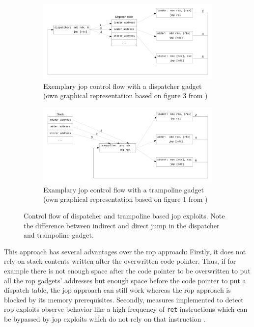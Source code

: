 \begin{figure}[htb]
	\centering
	\begin{subfigure}[t]{0.8\textwidth}
		\centering
		\includegraphics[width=\textwidth]{figures/jop-dispatcher}
		\caption{Exemplary \acs{jop} control flow with a dispatcher gadget (own graphical representation based on figure 3 from \cite{Bletsch2011})}
		\label{fig:jop-dispatcher}
		\vspace*{1em}
	\end{subfigure}
	\begin{subfigure}[t]{0.8\textwidth}
		\centering
		\includegraphics[width=\textwidth]{figures/jop-trampoline}
		\caption{Examplary \acs{jop} control flow with a trampoline gadget (own graphical representation based on figure 1 from \cite{Checkoway2010})}
		\label{fig:jop-trampoline}
	\end{subfigure}
	\caption{Control flow of dispatcher and trampoline based \acs{jop} exploits. Note the difference between indirect and direct jump in the dispatcher and trampoline gadget.}
	\label{fig:jump-oriented-programming}
\end{figure}

This approach has several advantages over the \gls{rop} approach:
Firstly, it does not rely on stack contents written after the overwritten code pointer.
Thus, if for example there is not enough space after the code pointer to be overwritten to put all the \gls{rop} gadgets' addresses but enough space before the code pointer to put a dispatch table, the \gls{jop} approach can still work whereas the \gls{rop} approach is blocked by its memory prerequisites.
Secondly, measures implemented to detect \gls{rop} exploits observe behavior like a high frequency of \texttt{ret} instructions which can be bypassed by \gls{jop} exploits which do not rely on that instruction \cite{Bletsch2011}.

